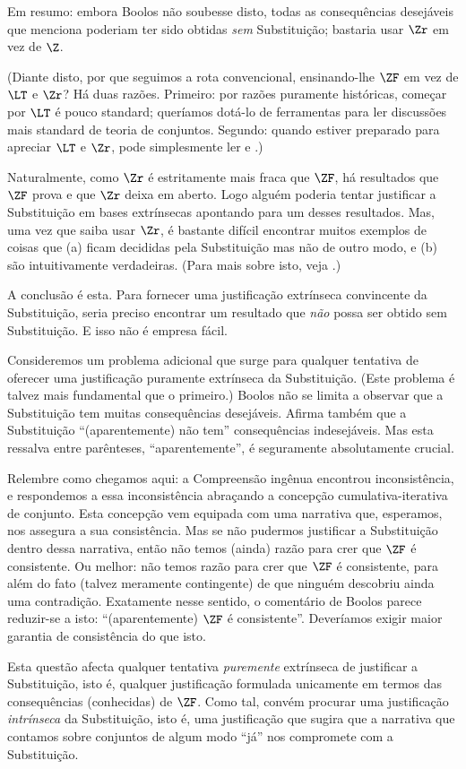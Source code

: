 \documentclass[../../../include/open-logic-section]{subfiles}
\begin{document}
Em
resumo: embora Boolos não soubesse disto, todas as consequências desejáveis
que menciona poderiam ter sido obtidas \emph{sem} Substituição; bastaria usar $\Zr$ em vez de $\Z$. 

(Diante disto, por que seguimos a rota convencional, ensinando-lhe $\ZF$ em vez de $\LT$ e $\Zr$? Há duas razões. Primeiro: por razões puramente históricas, começar por $\LT$ é pouco standard; queríamos
dotá-lo de ferramentas para ler discussões mais standard de teoria de conjuntos. Segundo: quando estiver preparado para
apreciar $\LT$ e $\Zr$, pode simplesmente ler \citealt{Potter2004} e \citealt{ButtonLT1}.)

Naturalmente, como $\Zr$ é estritamente mais fraca que $\ZF$, há resultados que
$\ZF$ prova e que $\Zr$ deixa em aberto. Logo alguém poderia tentar justificar a
Substituição em bases extrínsecas apontando para um desses resultados.
Mas, uma vez que saiba usar $\Zr$, é bastante difícil encontrar muitos
exemplos de coisas que (a) ficam decididas pela Substituição mas não
de outro modo, e (b) são intuitivamente verdadeiras. (Para mais sobre isto, veja
\citealt[\S13.2]{Potter2004}.)

A conclusão é esta. Para fornecer uma justificação extrínseca convincente da Substituição, seria preciso encontrar um resultado que
\emph{não} possa ser obtido sem Substituição. E isso não é empresa fácil. 

Consideremos um problema adicional que surge para qualquer tentativa de oferecer
uma justificação puramente extrínseca da Substituição. (Este problema é
talvez mais fundamental que o primeiro.) Boolos não se limita a observar
que a Substituição tem muitas consequências desejáveis. Afirma também
que a Substituição ``(aparentemente) não tem'' consequências indesejáveis. Mas
esta ressalva entre parênteses, ``aparentemente'', é seguramente absolutamente
crucial.

Relembre como chegamos aqui: a Compreensão ingênua encontrou
inconsistência, e respondemos a essa inconsistência abraçando a
concepção cumulativa-iterativa de conjunto. Esta concepção vem equipada
com uma narrativa que, esperamos, nos assegura a sua consistência. Mas se
não pudermos justificar a Substituição dentro dessa narrativa, então não temos (ainda)
razão para crer que $\ZF$ é consistente. Ou melhor: não temos
razão para crer que $\ZF$ é consistente, para além do fato (talvez
meramente contingente) de que ninguém descobriu ainda uma contradição.
Exatamente nesse sentido, o comentário de Boolos parece reduzir-se a isto: ``(aparentemente) $\ZF$ é consistente''. Deveríamos exigir
maior garantia de consistência do que isto. 

Esta questão afecta qualquer tentativa \emph{puremente} extrínseca de justificar a
Substituição, isto é, qualquer justificação formulada unicamente em termos
das consequências (conhecidas) de $\ZF$. Como tal, convém procurar uma
justificação \emph{intrínseca} da Substituição, isto é, uma
justificação que sugira que a narrativa que contamos sobre conjuntos
de algum modo ``já'' nos compromete com a Substituição. 
\end{document}
